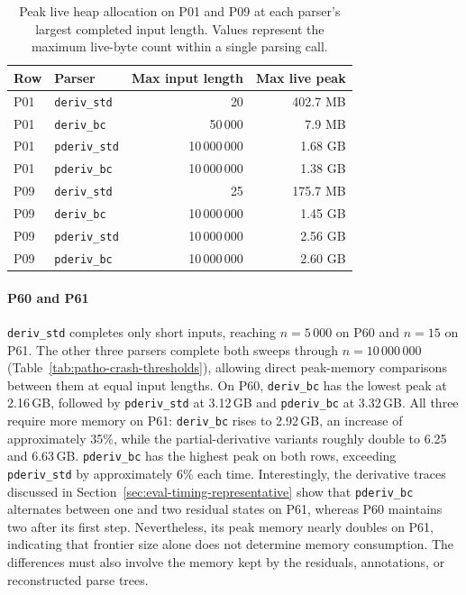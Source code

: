 \begin{table}[H]
\centering
\small
\setlength{\tabcolsep}{4pt}
\begin{tabular*}{\textwidth}{@{\extracolsep{\fill}} llrr}
\hline
Row & Parser & Max input length & Max live peak \\
\hline
P01 & \texttt{deriv\_std}               &         20 & 402.7 MB \\
P01 & \texttt{deriv\_bc}                      &     50\,000 &   7.9 MB \\
P01 & \texttt{pderiv\_std}                    & 10\,000\,000 & 1.68 GB \\
P01 & \texttt{pderiv\_bc}                     & 10\,000\,000 & 1.38 GB \\
\hline
P09 & \texttt{deriv\_std}               &         25 & 175.7 MB \\
P09 & \texttt{deriv\_bc}                      & 10\,000\,000 & 1.45 GB \\
P09 & \texttt{pderiv\_std}                    & 10\,000\,000 & 2.56 GB \\
P09 & \texttt{pderiv\_bc}                     & 10\,000\,000 & 2.60 GB \\
\hline
\end{tabular*}
\caption{Peak live heap allocation on P01 and P09
at each parser's largest completed input length.
Values represent the maximum live-byte count
within a single parsing call.}
\label{tab:patho-memory-ab}
\end{table}


\paragraph{P60 and P61}
\texttt{deriv\_std} completes only short inputs,
reaching $n=5\,000$ on P60 and $n=15$ on P61.
The other three parsers complete both sweeps
through $n=10\,000\,000$
(Table~\ref{tab:patho-crash-thresholds}),
allowing direct peak-memory comparisons
between them at equal input lengths.
On P60, \texttt{deriv\_bc} has the lowest
peak at 2.16\,GB, followed by
\texttt{pderiv\_std} at 3.12\,GB and
\texttt{pderiv\_bc} at 3.32\,GB.
All three require more memory on P61:
\texttt{deriv\_bc} rises to 2.92\,GB,
an increase of approximately 35\%,
while the partial-derivative variants
roughly double to 6.25 and 6.63\,GB.
\texttt{pderiv\_bc} has the highest peak
on both rows, exceeding \texttt{pderiv\_std}
by approximately 6\% each time.
Interestingly, the derivative traces
discussed in
Section~\ref{sec:eval-timing-representative}
show that \texttt{pderiv\_bc} alternates
between one and two residual states on P61,
whereas P60 maintains two after its first step.
Nevertheless, its peak memory nearly doubles
on P61, indicating that frontier size alone
does not determine memory consumption.
The differences must also involve the memory
kept by the residuals, annotations,
or reconstructed parse trees.


